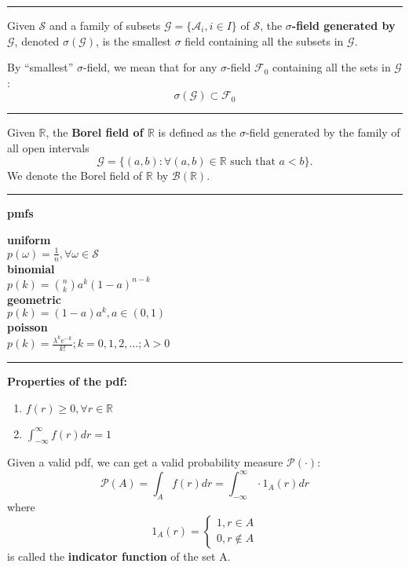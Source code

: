 \documentclass{article}
\renewcommand{\S}{\mathcal{S}}
\renewcommand{\P}{\mathcal{P}}
\providecommand{\A}{\mathcal{A}}
\providecommand{\B}{\mathcal{B}}
\providecommand{\G}{\mathcal{G}}
\providecommand{\F}{\mathcal{F}}
\providecommand{\R}{\mathbb{R}}
\begin{document}
\begin{multicols*}{3}
        \noindent\rule{\columnwidth}{0.4pt}

        Given $\S$ and a family of subsets $\G=\{\A_i, i\in I\}$ of $\S$, the \textbf{$\sigma$-field generated by $\G$}, denoted $\sigma(\G)$, is the smallest $\sigma$ field containing all the subsets in $\G$.

        By ``smallest'' $\sigma$-field, we mean that for any $\sigma$-field $\F_0$ containing all the sets in $\G$:
        \begin{equation*}
            \sigma(\G)\subset\F_0
        \end{equation*}

        \noindent\rule{\columnwidth}{0.4pt}

        Given $\R$, the \textbf{Borel field of $\R$} is defined as the $\sigma$-field generated by the family of all open intervals
        \begin{equation*}
            \G=\{(a,b):\forall(a,b)\in\R \text{ such that }a < b\}.
        \end{equation*}
        We denote the Borel field of $\R$ by $\B(\R)$.

        \noindent\rule{\columnwidth}{0.4pt}

        \textbf{pmfs}

        \textbf{uniform}\\
        $p(\omega)=\frac{1}{n},\forall\omega\in\S$\\

        \textbf{binomial}\\
        $p(k)=\allowbreak{n\choose k}a^k(1-a)^{n-k}$\\

        \textbf{geometric}\\
        $p(k)=(1-a)a^k,a\in(0,1)$\\

        \textbf{poisson}\\
        $p(k)=\frac{\lambda^{k}e^{-k}}{k!};k=0,1,2,\dots;\lambda>0$

        \noindent\rule{\columnwidth}{0.4pt}

        \textbf{Properties of the pdf:}
        \begin{enumerate}
            \item $f(r)\geq0,\forall r\in\R$
            \item $\int_{-\infty}^{\infty} f(r)dr=1$
        \end{enumerate}
        Given a valid pdf, we can get a valid probability measure $\P(\cdot)$:
        \begin{equation*}
            \P(A)=\int_{A}f(r)dr=\int_{-\infty}^{\infty}\cdot1_A(r)dr
        \end{equation*}
        where
        \begin{equation*}
            1_A(r) =
            \begin{cases}
                1,r\in A\\
                0,r\notin A
            \end{cases}
        \end{equation*}
        is called the \textbf{indicator function} of the set A\@.


\end{multicols*}
\end{document}

